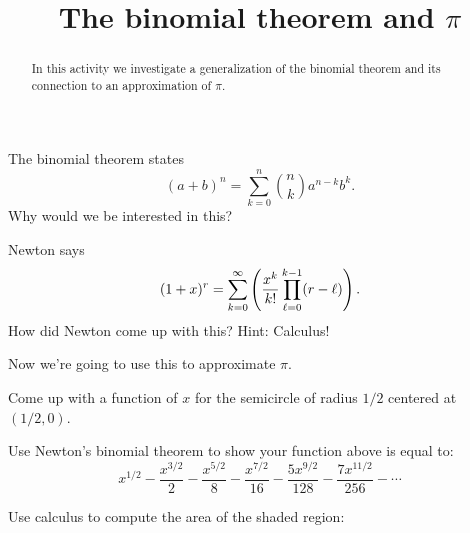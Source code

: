 \documentclass[nooutcomes]{ximera}
\title{The binomial theorem and $\pi$}
\begin{document}
\begin{abstract}
In this activity we investigate a generalization of the binomial theorem and its connection to an approximation of $\pi$.
\end{abstract}
\maketitle


\begin{question}
The binomial theorem states
\[
(a+b)^n = \sum_{k=0}^n \binom{n}{k} a^{n-k}b^k.
\]
Why would we be interested in this? 
\end{question}

\begin{question}
Newton says
\[
(1+x)^r = \sum_{k=0}^\infty \left(\frac{x^k}{k!} \prod_{\ell = 0}^{k-1}(r-\ell)\right).
\]
How did Newton come up with this? Hint: Calculus!
\end{question}

Now we're going to use this to approximate $\pi$.

\begin{question}
Come up with a function of $x$ for the semicircle of radius $1/2$ centered at $(1/2,0)$. 
\end{question}

\begin{question}
Use Newton's binomial theorem to show your function above is equal to: 
\[
x^{1/2} - \frac{x^{3/2}}{2} - \frac{x^{5/2}}{8} - \frac{x^{7/2}}{16}   - \frac{5x^{9/2}}{128}  - \frac{7x^{11/2}}{256} - \cdots
\]
\end{question}

\begin{question}
Use calculus to compute the area of the shaded region:
\begin{image}
\end{image}
\end{question}
\end{document}
